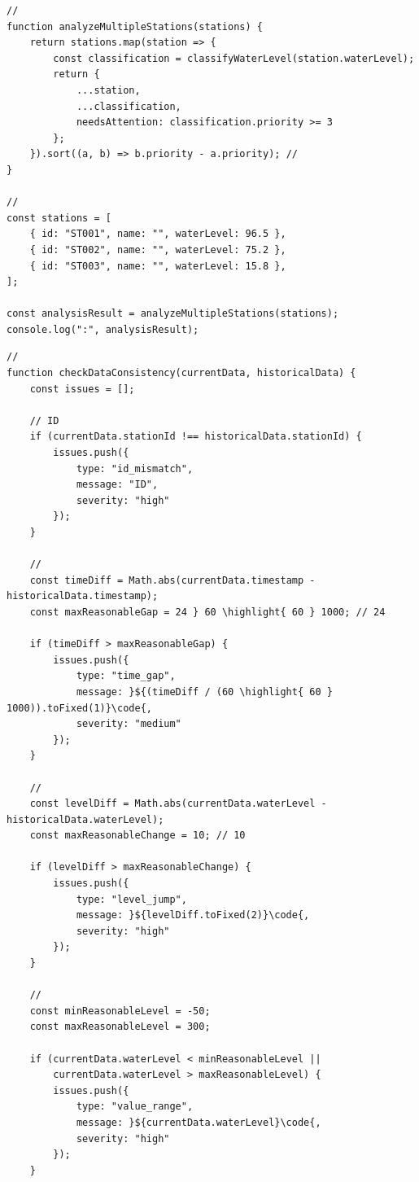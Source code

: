 {\begin{lstlisting}[style=javascript]
// 
function analyzeMultipleStations(stations) {
    return stations.map(station => {
        const classification = classifyWaterLevel(station.waterLevel);
        return {
            ...station,
            ...classification,
            needsAttention: classification.priority >= 3
        };
    }).sort((a, b) => b.priority - a.priority); // 
}

// 
const stations = [
    { id: "ST001", name: "", waterLevel: 96.5 },
    { id: "ST002", name: "", waterLevel: 75.2 },
    { id: "ST003", name: "", waterLevel: 15.8 },
];

const analysisResult = analyzeMultipleStations(stations);
console.log(":", analysisResult);
\end{lstlisting}

\important{}

\begin{lstlisting}[style=javascript]
// 
function checkDataConsistency(currentData, historicalData) {
    const issues = [];
    
    // ID
    if (currentData.stationId !== historicalData.stationId) {
        issues.push({
            type: "id_mismatch",
            message: "ID",
            severity: "high"
        });
    }
    
    // 
    const timeDiff = Math.abs(currentData.timestamp - historicalData.timestamp);
    const maxReasonableGap = 24 } 60 \highlight{ 60 } 1000; // 24
    
    if (timeDiff > maxReasonableGap) {
        issues.push({
            type: "time_gap",
            message: }${(timeDiff / (60 \highlight{ 60 } 1000)).toFixed(1)}\code{,
            severity: "medium"
        });
    }
    
    // 
    const levelDiff = Math.abs(currentData.waterLevel - historicalData.waterLevel);
    const maxReasonableChange = 10; // 10
    
    if (levelDiff > maxReasonableChange) {
        issues.push({
            type: "level_jump",
            message: }${levelDiff.toFixed(2)}\code{,
            severity: "high"
        });
    }
    
    // 
    const minReasonableLevel = -50;
    const maxReasonableLevel = 300;
    
    if (currentData.waterLevel < minReasonableLevel || 
        currentData.waterLevel > maxReasonableLevel) {
        issues.push({
            type: "value_range",
            message: }${currentData.waterLevel}\code{,
            severity: "high"
        });
    }
    

\end{lstlisting}}
